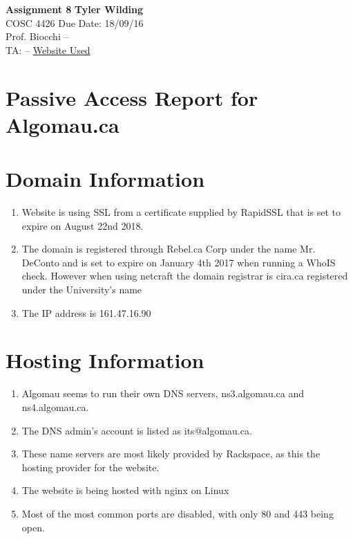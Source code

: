 \documentclass[a4paper, 11pt]{article}
\begin{document}
\noindent
\large\textbf{Assignment 8} \hfill \textbf{Tyler Wilding} \\
\normalsize COSC 4426 \hfill Due Date: 18/09/16 \\
Prof. Biocchi \hfill -- \\
TA: -- \hfill \href{http://www.algomau.ca}{Website Used}

\section*{Passive Access Report for Algomau.ca}

\section*{Domain Information}
\begin{enumerate}
\item Website is using SSL from a certificate supplied by RapidSSL that is set to expire on August 22nd 2018.
\item The domain is registered through Rebel.ca Corp under the name Mr. DeConto and is set to expire on January 4th 2017 when running a WhoIS check. However when using netcraft the domain registrar is cira.ca registered under the University's name
\item The IP address is 161.47.16.90
\end{enumerate}

\section*{Hosting Information}
\begin{enumerate}
\item Algomau seems to run their own DNS servers, ns3.algomau.ca and ns4.algomau.ca.
\item The DNS admin's account is listed as its@algomau.ca.
\item These name servers are most likely provided by Rackspace, as this the hosting provider for the website.
\item The website is being hosted with nginx on Linux
\item Most of the most common ports are disabled, with only 80 and 443 being open.
\end{enumerate}
\end{document}
